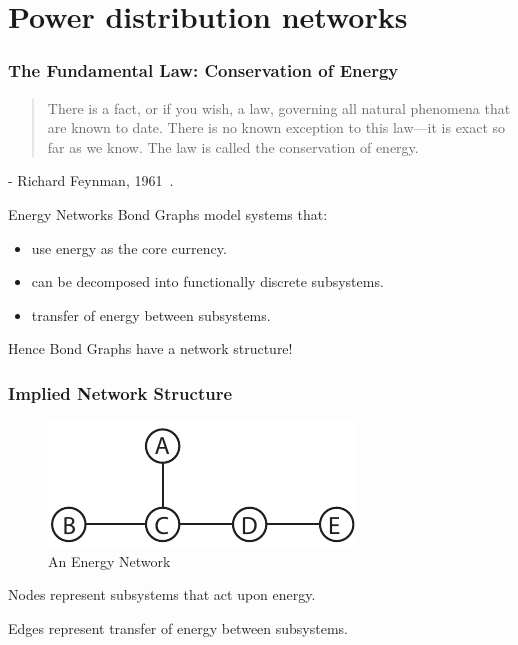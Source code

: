 \documentclass[11pt,reqno]{beamer}
\begin{document}
\section{Power distribution networks}
\begin{frame}
\frametitle{The Fundamental Law: Conservation of Energy}
\begin{quotation}
	There is a fact, or if you wish, a law, governing all natural phenomena that are known to date. There is no known exception to this law—it is exact so far as we know. The law is called the conservation of energy.
\end{quotation}

- Richard Feynman, 1961~\cite{Feynman1961}.
\end{frame}
\begin{frame}{Energy Networks}
Bond Graphs model systems that:
\begin{itemize}
	\item use energy as the core currency.
	\item can be decomposed into functionally discrete subsystems.
	\item transfer of energy between subsystems.
\end{itemize}
\vspace{1cm}
Hence Bond Graphs have a network structure!
\end{frame}
\begin{frame}
\frametitle{Implied Network Structure}
\begin{figure}
	\centering
	\includegraphics{network_1.pdf}
	\caption{An Energy Network}
\end{figure}
Nodes represent subsystems that act upon energy.

\vspace{5pt}

Edges represent transfer of energy between subsystems.
\end{frame}
\end{document}
